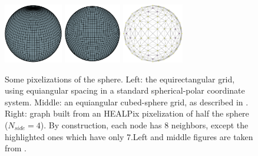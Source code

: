 \documentclass[final,twocolumn,3p,times,authoryear]{elsarticle}
\newcommand{\1}{\b{1}}              %
\newcommand{\0}{\b{0}}              %
\begin{document}
\begin{figure}
	\centering
	\includegraphics[height=7em]{sphere_grid_equirectangular}
	\hfill
	\includegraphics[height=7em]{sphere_grid_cubedsphere}
	\hfill
	\includegraphics[height=7em]{half_graph_4}
	\caption[]{Some pixelizations of the sphere. Left: the equirectangular grid, using equiangular spacing in a standard spherical-polar coordinate system. Middle: an equiangular cubed-sphere grid, as described in \citet{ronchi1996cubed}. Right: graph built from an HEALPix pixelization of half the sphere ($N_{side} = 4$). By construction, each node has 8 neighbors, except the highlighted ones which have only 7.\footnotemark[7] Left and middle figures are taken from \citet{boomsma2017spherical}.}
	\label{fig:sphere_grids}
	\label{fig:healpix_graph_4}
\end{figure}

\end{document}
